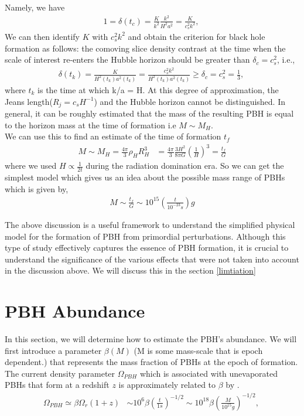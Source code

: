 Namely, we have
\begin{align}
    1=\delta\left(t_c\right)=\frac{K}{k^2} \frac{k^2}{H^2 a^2}=\frac{K}{c_s^2 k^2} ,\ \label{3.7}
\end{align}
We can then identify $K$ with $c_s^2 k^2$ and obtain the criterion for black hole formation as follows: the comoving slice density contrast at the time when the scale of interest re-enters the Hubble horizon should be greater than $\delta_c=c_s^2$, i.e.,
\begin{align}
    \delta\left(t_k\right)=\frac{K}{H^2\left(t_k\right) a^2\left(t_k\right)}=\frac{c_s^2 k^2}{H^2\left(t_k\right) a^2\left(t_k\right)} \geq \delta_c=c_s^2=\frac{1}{3},\ \label{3.8}
\end{align}
where $t_k$ is the time at which k/a = H.
At this degree of approximation, the Jeans length($ R_{j} = c_{s} H^{-1}$) and the Hubble horizon cannot be distinguished. In general, it can be roughly estimated that the mass of the resulting PBH  is equal to the horizon mass at the time of formation i.e $M \sim M_{H} $.\\
We can use this to find an estimate of the time of formation $t_f$
\begin{align}
    M \sim M_{H} = \frac{4\pi}{3} \rho_{H} R_{H}^3 
    &= \frac{4\pi}{3} \frac{3H^2}{8 \pi G} \left(\frac{1}{H} \right)^3 = \frac{t_f}{G} \label{3.9}
\end{align}
where we used $H \propto \frac{1}{2t}$ during the radiation domination era. So we can get the simplest model which gives us an idea about the possible mass range of PBHs which is given by,
\begin{align}
    M \sim 
    \frac{t_f}{G} \sim 10^{15} \left(\frac{t}{10^{-23} s} \right)g \label{3.10}
\end{align}

The above discussion is a useful framework to understand the simplified physical model for the formation of PBH from primordial perturbations. Although this type of study effectively captures the essence of PBH formation, it is crucial to understand the significance of the various effects that were not taken into account in the discussion above. We will discuss this in the section \ref{limtiation}

\section{PBH Abundance}
In this section, we will determine how to estimate the PBH's abundance. We will first introduce a parameter $\beta(M)$ (M is some mass-scale that is epoch dependent.) that represents the mass fraction of PBHs at the epoch of formation. The current density parameter $\Omega_{PBH}$ which is associated with unevaporated PBHs that form at a redshift $z$ is approximately related to $\beta$ by \cite{1975ApJ...201....1C}.
\begin{align}
    \Omega_{PBH} \simeq \beta\Omega_{r}(1+z)
    &\sim 10^6\beta\left( \frac{t}{1s}\right)^{-1/2} 
    \sim 10^{18}\beta \left(\frac{M}{10^{15}g }\right)^{-1/2},\ \label{3.11}
\end{align}

